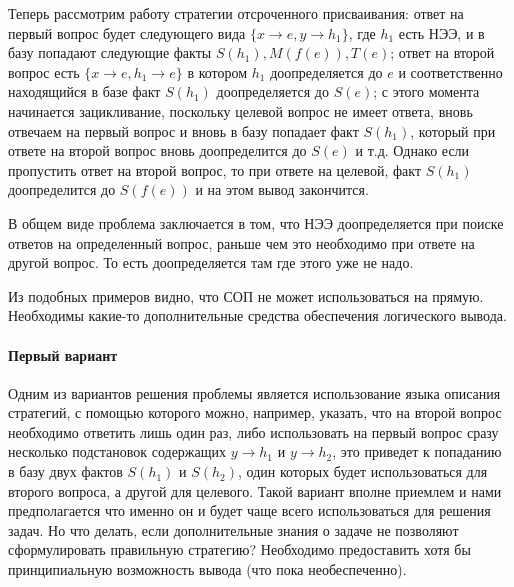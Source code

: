 Теперь рассмотрим работу стратегии отсроченного присваивания: ответ на первый вопрос будет следующего вида $\{ x\rightarrow e, y\rightarrow h_1 \}$, где $h_1$ есть НЭЭ, и в базу попадают следующие факты $S(h_1),M(f(e)),T(e)$; ответ на второй вопрос есть $\{ x\rightarrow e, h_1\rightarrow e \}$ в котором $h_1$ доопределяется до $e$ и соответственно находящийся в базе факт $S(h_1)$ доопределяется до $S(e)$; с этого момента начинается зацикливание, поскольку целевой вопрос не имеет ответа, вновь отвечаем на первый вопрос и вновь в базу попадает факт $S(h_1)$, который при ответе на второй вопрос вновь доопределится до $S(e)$ и т.д. Однако если пропустить ответ на второй вопрос, то при ответе на целевой, факт $S(h_1)$ доопределится до $S(f(e))$ и на этом вывод закончится. 

В общем виде проблема заключается в том, что НЭЭ доопределяется при поиске ответов на определенный вопрос, раньше чем это необходимо при ответе на другой вопрос. То есть доопределяется там где этого уже не надо.

Из подобных примеров видно, что СОП не может использоваться на прямую. Необходимы какие-то дополнительные средства обеспечения логического вывода.

\paragraph{Первый вариант} 
Одним из вариантов решения проблемы является использование языка описания стратегий, с помощью которого можно, например, указать, что на второй вопрос необходимо ответить лишь один раз, либо использовать на первый вопрос сразу несколько подстановок содержащих $y\rightarrow h_1$ и $y\rightarrow h_2$, это приведет к попаданию в базу двух фактов $S(h_1)$ и $S(h_2)$, один которых будет использоваться для второго вопроса, а другой для целевого. Такой вариант вполне приемлем и нами предполагается что именно он и будет чаще всего использоваться для решения задач. Но что делать, если дополнительные знания о задаче не позволяют сформулировать правильную стратегию? Необходимо предоставить хотя бы принципиальную возможность вывода (что пока необеспеченно).

